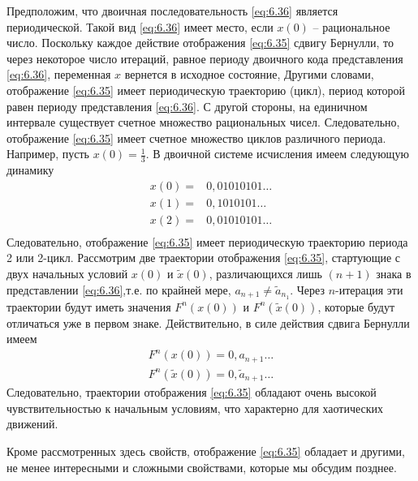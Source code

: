 Предположим, что двоичная последовательность \eqref{eq:6.36} является
периодической. Такой вид \eqref{eq:6.36} имеет место, если $x(0)$ -- рациональное число.
Поскольку каждое действие отображения \eqref{eq:6.35} сдвигу Бернулли,
то через некоторое число итераций, равное периоду двоичного кода
представления \eqref{eq:6.36}, переменная $x$ вернется в исходное состояние, Другими
словами, отображение \eqref{eq:6.35} имеет периодическую траекторию (цикл), период
которой равен периоду представления \eqref{eq:6.36}. С другой стороны, на единичном
интервале существует счетное множество рациональных чисел. Следовательно,
отображение \eqref{eq:6.35} имеет счетное множество циклов различного периода.
Например, пусть $x(0) = \frac{1}{3}$. В двоичной системе исчисления имеем следующую
динамику
\begin{align}
        x(0) = & 0,01010101 \dots \\
        x(1) = & 0,1010101 \dots \\
        x(2) = & 0,01010101 \dots \\
\end{align}
Следовательно, отображение \eqref{eq:6.35} имеет периодическую траекторию периода 2 или 2-цикл.
Рассмотрим две траектории отображения \eqref{eq:6.35}, стартующие с двух начальных условий $x(0)$ 
и $\tilde x(0)$,
различающихся лишь $(n+1)$ знака в представлении \eqref{eq:6.36},т.е. по крайней мере, $a_{n+1}\neq \tilde a_{n_1}$. Через $n$-итерация эти траектории будут иметь значения $F^n (x(0))$ и $F^n (\tilde x(0))$, которые будут отличаться уже в первом знаке.
Действительно, в силе действия сдвига Бернулли имеем
\begin{gather}
        F^n(x(0)) = 0 , a_{n+1}\dots \\
        F^n(\tilde x(0)) = 0, \tilde a_{n+1} \dots 
\end{gather}
Следовательно, траектории отображения \eqref{eq:6.35} обладают очень высокой чувствительностью
к начальным условиям, что характерно для хаотических движений.

Кроме рассмотренных здесь свойств, отображение \eqref{eq:6.35} обладает и другими, не менее интересными и сложными свойствами, которые мы обсудим позднее.


